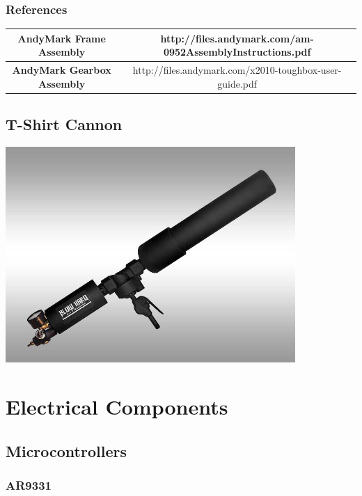 \documentclass[letterpaper,12pt]{report}
\begin{document}
\subsection{References}

\begin{table}[h!]
  \begin{tabular}{| c | c |}
    \hline
    \textbf{AndyMark Frame Assembly} &  http://files.andymark.com/am-0952AssemblyInstructions.pdf\\
    \hline
    \textbf{AndyMark Gearbox Assembly} &  http://files.andymark.com/x2010-toughbox-user-guide.pdf\\
    \hline
  \end{tabular}
  \label{tab:fire_cmd_msg}
\end{table}

\section{T-Shirt Cannon}
\begin{center}
    \includegraphics[width=11cm]{pics/cannon/blowhard_cannon.jpg}
\end{center}

\chapter{Electrical Components}

\section{Microcontrollers}
\subsection{AR9331}
\end{document}
